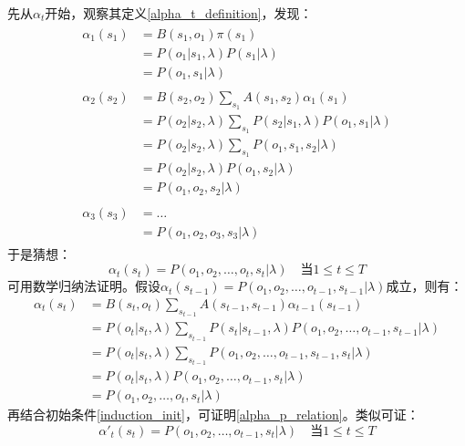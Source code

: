 \documentclass[11pt,a4paper]{article}
\numberwithin{equation}{section}
\begin{document}
先从$\alpha_t$开始，观察其定义\eqref{alpha_t_definition}，发现：
\begin{align}
\begin{split}\label{induction_init}
\alpha_1(s_1) & = B(s_1, o_1) \pi(s_1) \\
& = P(o_1 | s_1, \lambda) P(s_1 | \lambda) \\ 
& = P(o_1, s_1 | \lambda)
\end{split}
\\
\begin{split}
\alpha_2(s_2) & = B(s_2, o_2) \sum_{s_1} A(s_1, s_2) \alpha_1(s_1) \\
& = P(o_2 | s_2, \lambda) \sum_{s_1} P(s_2 | s_1, \lambda) P(o_1, s_1 | \lambda) \\
& = P(o_2 | s_2, \lambda) \sum_{s_1} P(o_1, s_1, s_2 | \lambda) \\
& = P(o_2 | s_2, \lambda) P(o_1, s_2 | \lambda) \\
& = P(o_1, o_2, s_2 | \lambda)
\end{split}
\\
\begin{split}
\alpha_3(s_3) & = \ldots \\
& = P(o_1, o_2, o_3, s_3 | \lambda)
\end{split}
\end{align}
于是猜想：
\begin{equation}\label{alpha_p_relation}
\alpha_t(s_t) = P(o_1, o_2, \ldots, o_t, s_t | \lambda) \quad \text{当} 1 \le t \le T
\end{equation}
可用数学归纳法证明。假设$\alpha_t(s_{t - 1}) = P(o_1, o_2, \ldots, o_{t - 1}, s_{t - 1} | \lambda)$成立，则有：
\begin{equation}
\begin{split}
\alpha_t(s_t) & = B(s_t, o_t) \sum_{s_{t - 1}} A(s_{t - 1}, s_{t - 1}) \alpha_{t - 1}(s_{t - 1}) \\
& = P(o_t | s_t, \lambda) \sum_{s_{t - 1}} P(s_t | s_{t - 1}, \lambda) P(o_1, o_2, \ldots, o_{t - 1}, s_{t - 1} | \lambda) \\
& = P(o_t | s_t, \lambda) \sum_{s_{t - 1}} P(o_1, o_2, \ldots, o_{t - 1}, s_{t - 1}, s_t | \lambda) \\
& = P(o_t | s_t, \lambda) P(o_1, o_2, \ldots, o_{t - 1}, s_t | \lambda) \\
& = P(o_1, o_2, \ldots, o_t, s_t | \lambda)
\end{split}
\end{equation}
再结合初始条件\eqref{induction_init}，可证明\eqref{alpha_p_relation}。类似可证：
\begin{equation}\label{alpha'_p_relation}
\alpha'_t(s_t) = P(o_1, o_2, \ldots, o_{t - 1}, s_t | \lambda) \quad \text{当} 1 \le t \le T
\end{equation}
\end{document}
